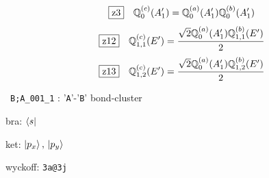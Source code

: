 \documentclass[fleqn,10pt,landscape]{jsarticle}
\begin{document}
\begin{dmath*}
\hspace*{3mm}\fbox{z3}\quad \mathbb{Q}_{0}^{(c)}(A_{1}^{\prime})=\mathbb{Q}_{0}^{(a)}(A_{1}^{\prime}) \mathbb{Q}_{0}^{(b)}(A_{1}^{\prime})
\end{dmath*}
\begin{dmath*}
\hspace*{3mm}\fbox{z12}\quad \mathbb{Q}_{1,1}^{(c)}(E^{\prime})=\frac{\sqrt{2} \mathbb{Q}_{0}^{(a)}(A_{1}^{\prime}) \mathbb{Q}_{1,1}^{(b)}(E^{\prime})}{2}
\end{dmath*}
\begin{dmath*}
\hspace*{3mm}\fbox{z13}\quad \mathbb{Q}_{1,2}^{(c)}(E^{\prime})=\frac{\sqrt{2} \mathbb{Q}_{0}^{(a)}(A_{1}^{\prime}) \mathbb{Q}_{1,2}^{(b)}(E^{\prime})}{2}
\end{dmath*}
\vspace{5mm}

\noindent\textbullet\, \texttt{B;A_001_1} : '\texttt{A}'-'\texttt{B}' bond-cluster

\noindent\quad * bra: $\bra{s}$

\noindent\quad * ket: $\ket{p_{x}},\, \ket{p_{y}}$

\noindent\quad * wyckoff: \texttt{3a@3j}
\end{document}

